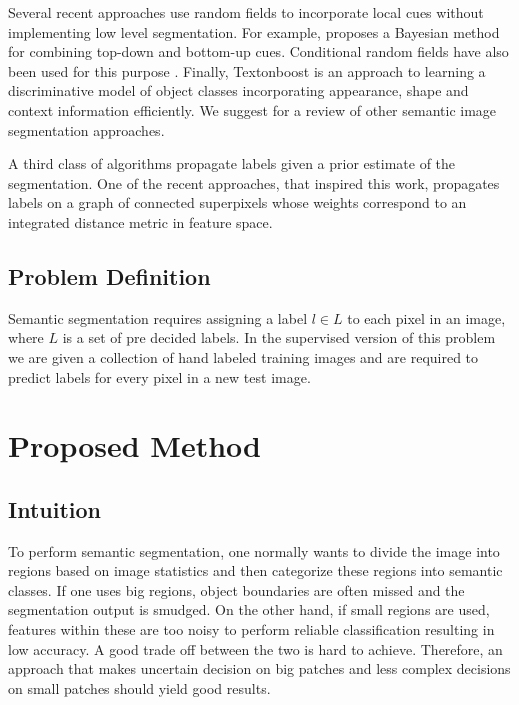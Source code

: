 \documentclass{article} %
\begin{document}
Several recent approaches use random fields to incorporate local cues without implementing low level segmentation. For example, \cite{Kumar:2005:OC:1068507.1068889} proposes a Bayesian method for combining top-down and bottom-up cues. Conditional random fields have also been used for this purpose \cite{Kumar:2005:HFF:1097115.1097790} \cite{Richard04multiscaleconditional}. Finally, Textonboost \cite{Shotton06textonboost:joint} is an approach to learning a discriminative model of object classes incorporating appearance, shape and context information efficiently. We suggest \cite{SegmentRegionsParts} for a review of other semantic image segmentation approaches.

A third class of algorithms propagate labels given a prior estimate of the segmentation. One of the recent approaches, that inspired this work, propagates labels on a graph of connected superpixels whose weights correspond to an integrated distance metric in feature space.


\subsection{Problem Definition}
\label{sec:Problem}
Semantic segmentation requires assigning a label $l \in L$ to each pixel in an image, where $L$ is a set of pre decided labels. In the supervised version of this problem we are given a collection of hand labeled training images and are required to predict labels for every pixel in a new test image. 

\section{Proposed Method}
\label{sec:Proposed}
\subsection{Intuition}
\label{sec:intuition}
To perform semantic segmentation, one normally wants to divide the image into regions based on image statistics and then categorize these regions into semantic classes. If one uses big regions, object boundaries are often missed and the segmentation output is smudged. On the other hand, if small regions are used, features within these are too noisy to perform reliable classification resulting in low accuracy. A good trade off between the two is hard to achieve. Therefore, an approach that makes uncertain decision on big patches and less complex decisions on small patches should yield good results. 
\end{document}
